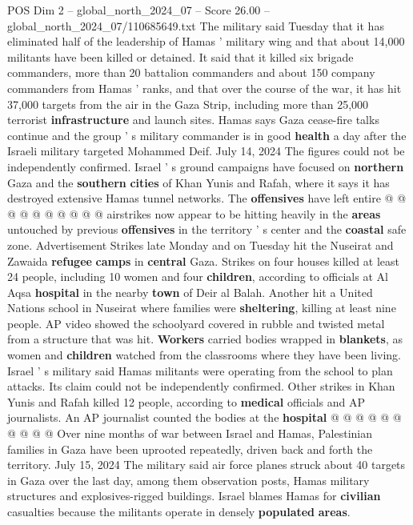 \begin{textsample}{POS Dim 2 – global\_north\_2024\_07 – Score 26.00 – global\_north\_2024\_07/110685649.txt}
The military said Tuesday that it has eliminated half of the leadership of Hamas ' military wing and that about 14,000 militants have been killed or detained.
It said that it killed six brigade commanders, more than 20 battalion commanders and about 150 company commanders from Hamas ' ranks, and that over the course of the war, it has hit 37,000 targets from the air in the Gaza Strip, including more than 25,000 terrorist \textbf{infrastructure} and launch sites.
Hamas says Gaza cease-fire talks continue and the group ' s military commander is in good \textbf{health} a day after the Israeli military targeted Mohammed Deif.
July 14, 2024 The figures could not be independently confirmed.
Israel ' s ground campaigns have focused on \textbf{northern} Gaza and the \textbf{southern} \textbf{cities} of Khan Yunis and Rafah, where it says it has destroyed extensive Hamas tunnel networks.
The \textbf{offensives} have left entire @ @ @ @ @ @ @ @ @ @ airstrikes now appear to be hitting heavily in the \textbf{areas} untouched by previous \textbf{offensives} in the territory ' s center and the \textbf{coastal} safe zone.
Advertisement Strikes late Monday and on Tuesday hit the Nuseirat and Zawaida \textbf{refugee} \textbf{camps} in \textbf{central} Gaza.
Strikes on four houses killed at least 24 people, including 10 women and four \textbf{children}, according to officials at Al Aqsa \textbf{hospital} in the nearby \textbf{town} of Deir al Balah.
Another hit a United Nations school in Nuseirat where families were \textbf{sheltering}, killing at least nine people.
AP video showed the schoolyard covered in rubble and twisted metal from a structure that was hit. \textbf{Workers} carried bodies wrapped in \textbf{blankets}, as women and \textbf{children} watched from the classrooms where they have been living.
Israel ' s military said Hamas militants were operating from the school to plan attacks.
Its claim could not be independently confirmed.
Other strikes in Khan Yunis and Rafah killed 12 people, according to \textbf{medical} officials and AP journalists.
An AP journalist counted the bodies at the \textbf{hospital} @ @ @ @ @ @ @ @ @ @ Over nine months of war between Israel and Hamas, Palestinian families in Gaza have been uprooted repeatedly, driven back and forth the territory.
July 15, 2024 The military said air force planes struck about 40 targets in Gaza over the last day, among them observation posts, Hamas military structures and explosives-rigged buildings.
Israel blames Hamas for \textbf{civilian} casualties because the militants operate in densely \textbf{populated} \textbf{areas}.

\end{textsample}

